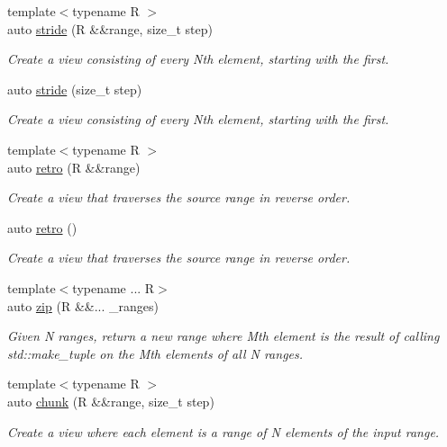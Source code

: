 \begin{DoxyCompactItemize}
{\footnotesize template$<$typename R $>$ }\\auto \mbox{\hyperlink{namespacerah_1_1view_a112a1a8d31435c1070c4cd98cc02d96a}{stride}} (R \&\&range, size\+\_\+t step)
\begin{DoxyCompactList}\small\item\em Create a view consisting of every Nth element, starting with the first. \end{DoxyCompactList}\item 
auto \mbox{\hyperlink{namespacerah_1_1view_a6b2ab3621be4004c35d77f06165fce78}{stride}} (size\+\_\+t step)
\begin{DoxyCompactList}\small\item\em Create a view consisting of every Nth element, starting with the first. \end{DoxyCompactList}\item 
{\footnotesize template$<$typename R $>$ }\\auto \mbox{\hyperlink{namespacerah_1_1view_ab7e756d22f9204231b4854b9deb51f6f}{retro}} (R \&\&range)
\begin{DoxyCompactList}\small\item\em Create a view that traverses the source range in reverse order. \end{DoxyCompactList}\item 
auto \mbox{\hyperlink{namespacerah_1_1view_a6c6543c61f1fb119394952a72c564753}{retro}} ()
\begin{DoxyCompactList}\small\item\em Create a view that traverses the source range in reverse order. \end{DoxyCompactList}\item 
{\footnotesize template$<$typename ... R$>$ }\\auto \mbox{\hyperlink{namespacerah_1_1view_a26c5da9052b94179d6ad8614ea2b9fda}{zip}} (R \&\&... \+\_\+ranges)
\begin{DoxyCompactList}\small\item\em Given N ranges, return a new range where Mth element is the result of calling std\+::make\+\_\+tuple on the Mth elements of all N ranges. \end{DoxyCompactList}\item 
{\footnotesize template$<$typename R $>$ }\\auto \mbox{\hyperlink{namespacerah_1_1view_aa4ea72dd93cb1d17db2f4755bdee0cef}{chunk}} (R \&\&range, size\+\_\+t step)
\begin{DoxyCompactList}\small\item\em Create a view where each element is a range of N elements of the input range. \end{DoxyCompactList}\item 

\end{DoxyCompactItemize}
